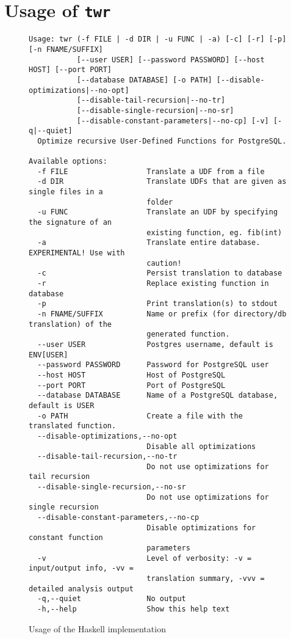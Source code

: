 \section{Usage of \texttt{twr}}
\begin{figure}[h]
    \centering\footnotesize
\begin{verbatim}
Usage: twr (-f FILE | -d DIR | -u FUNC | -a) [-c] [-r] [-p] [-n FNAME/SUFFIX]
           [--user USER] [--password PASSWORD] [--host HOST] [--port PORT]
           [--database DATABASE] [-o PATH] [--disable-optimizations|--no-opt]
           [--disable-tail-recursion|--no-tr]
           [--disable-single-recursion|--no-sr]
           [--disable-constant-parameters|--no-cp] [-v] [-q|--quiet]
  Optimize recursive User-Defined Functions for PostgreSQL.

Available options:
  -f FILE                  Translate a UDF from a file
  -d DIR                   Translate UDFs that are given as single files in a
                           folder
  -u FUNC                  Translate an UDF by specifying the signature of an
                           existing function, eg. fib(int)
  -a                       Translate entire database. EXPERIMENTAL! Use with
                           caution!
  -c                       Persist translation to database
  -r                       Replace existing function in database
  -p                       Print translation(s) to stdout
  -n FNAME/SUFFIX          Name or prefix (for directory/db translation) of the
                           generated function.
  --user USER              Postgres username, default is ENV[USER]
  --password PASSWORD      Password for PostgreSQL user
  --host HOST              Host of PostgreSQL
  --port PORT              Port of PostgreSQL
  --database DATABASE      Name of a PostgreSQL database, default is USER
  -o PATH                  Create a file with the translated function.
  --disable-optimizations,--no-opt
                           Disable all optimizations
  --disable-tail-recursion,--no-tr
                           Do not use optimizations for tail recursion
  --disable-single-recursion,--no-sr
                           Do not use optimizations for single recursion
  --disable-constant-parameters,--no-cp
                           Disable optimizations for constant function
                           parameters
  -v                       Level of verbosity: -v = input/output info, -vv =
                           translation summary, -vvv = detailed analysis output
  -q,--quiet               No output
  -h,--help                Show this help text
\end{verbatim}
    \caption{Usage of the Haskell implementation}
\end{figure}

